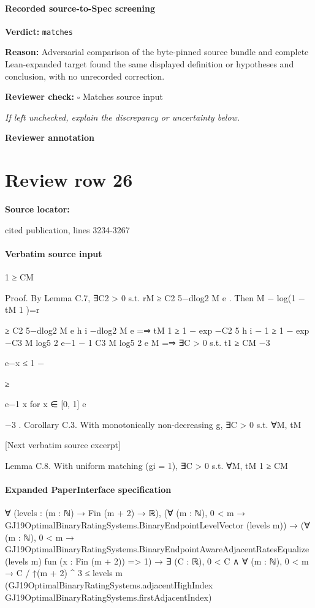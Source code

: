 \documentclass[10pt]{article}
\newcommand{\reviewerbox}{%
  \par\noindent\fbox{\parbox{0.96\linewidth}{\rule{0pt}{0.38in}}}\par
}
\newcommand{\reviewmatch}[1]{%
  \par\noindent\textbf{Reviewer check:} $\square$\; #1\par
  \noindent\emph{If left unchecked, explain the discrepancy or uncertainty below.}\par
}
\begin{document}
\paragraph{Recorded source-to-Spec screening}
\textbf{Verdict:} \texttt{matches}
\\
{\raggedright
\textbf{Reason:} Adversarial comparison of the byte-\allowbreak{}pinned source bundle and complete Lean-\allowbreak{}expanded target found the same displayed definition or hypotheses and conclusion, with no unrecorded correction.\allowbreak{}
\par}
\reviewmatch{Matches source input}
\noindent\textbf{Reviewer annotation}\par
\reviewerbox
\clearpage
\hypertarget{source-claim-905297a638ebd8e0}{}
\section*{Review row 26}
\textbf{Source locator:} {\footnotesize\raggedright cited publication, lines 3234-\allowbreak{}3267\par}
\paragraph{Verbatim source input}
\begin{ReviewVerbatim}
1 ≥ CM

Proof. By Lemma C.7, ∃C2 > 0 s.t. rM ≥ C2 5−dlog2 M e . Then
M
− log(1 − tM
1 )=r

≥ C2 5−dlog2 M e
h
i
−dlog2 M e
=⇒ tM
1 ≥ 1 − exp −C2 5
h
i
− 1
≥ 1 − exp −C3 M log5 2
e−1
− 1
C3 M log5 2
e
M
=⇒ ∃C > 0 s.t. t1 ≥ CM −3

e−x ≤ 1 −

≥

e−1
x for x ∈ [0, 1]
e

−3 .
Corollary C.3. With monotonically non-decreasing g, ∃C > 0 s.t. ∀M, tM

[Next verbatim source excerpt]

Lemma C.8. With uniform matching (gi = 1), ∃C > 0 s.t. ∀M, tM
1 ≥ CM
\end{ReviewVerbatim}



\paragraph{Expanded PaperInterface specification}
\begin{ReviewVerbatim}
∀ (levels : (m : ℕ) → Fin (m + 2) → ℝ),
  (∀ (m : ℕ), 0 < m → GJ19OptimalBinaryRatingSystems.BinaryEndpointLevelVector (levels m)) →
    (∀ (m : ℕ),
        0 < m →
          GJ19OptimalBinaryRatingSystems.BinaryEndpointAwareAdjacentRatesEqualize (levels m) fun (x : Fin (m + 2)) =>
            1) →
      ∃ (C : ℝ),
        0 < C ∧
          ∀ (m : ℕ),
            0 < m →
              C / ↑(m + 2) ^ 3 ≤
                levels m
                  (GJ19OptimalBinaryRatingSystems.adjacentHighIndex GJ19OptimalBinaryRatingSystems.firstAdjacentIndex)
\end{ReviewVerbatim}
\end{document}
